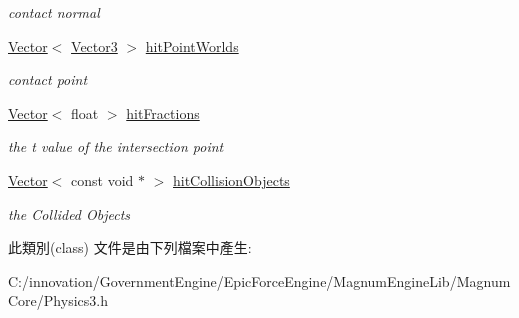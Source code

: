 \begin{DoxyCompactItemize}
\begin{DoxyCompactList}\small\item\em contact normal \end{DoxyCompactList}\item 
\hyperlink{class_i_dream_sky_1_1_vector}{Vector}$<$ \hyperlink{class_i_dream_sky_1_1_vector3}{Vector3} $>$ \hyperlink{class_i_dream_sky_1_1_physics3_1_1_ray_cast_result_a4de3080e1522809787618a7445aa776d}{hit\+Point\+Worlds}\hypertarget{class_i_dream_sky_1_1_physics3_1_1_ray_cast_result_a4de3080e1522809787618a7445aa776d}{}\label{class_i_dream_sky_1_1_physics3_1_1_ray_cast_result_a4de3080e1522809787618a7445aa776d}

\begin{DoxyCompactList}\small\item\em contact point \end{DoxyCompactList}\item 
\hyperlink{class_i_dream_sky_1_1_vector}{Vector}$<$ float $>$ \hyperlink{class_i_dream_sky_1_1_physics3_1_1_ray_cast_result_a90841fa58d0b835a265730e13198fed2}{hit\+Fractions}\hypertarget{class_i_dream_sky_1_1_physics3_1_1_ray_cast_result_a90841fa58d0b835a265730e13198fed2}{}\label{class_i_dream_sky_1_1_physics3_1_1_ray_cast_result_a90841fa58d0b835a265730e13198fed2}

\begin{DoxyCompactList}\small\item\em the t value of the intersection point \end{DoxyCompactList}\item 
\hyperlink{class_i_dream_sky_1_1_vector}{Vector}$<$ const void $\ast$ $>$ \hyperlink{class_i_dream_sky_1_1_physics3_1_1_ray_cast_result_a135790305d1f821dff9727b30323389e}{hit\+Collision\+Objects}\hypertarget{class_i_dream_sky_1_1_physics3_1_1_ray_cast_result_a135790305d1f821dff9727b30323389e}{}\label{class_i_dream_sky_1_1_physics3_1_1_ray_cast_result_a135790305d1f821dff9727b30323389e}

\begin{DoxyCompactList}\small\item\em the Collided Objects \end{DoxyCompactList}\end{DoxyCompactItemize}


此類別(class) 文件是由下列檔案中產生\+:\begin{DoxyCompactItemize}
\item 
C\+:/innovation/\+Government\+Engine/\+Epic\+Force\+Engine/\+Magnum\+Engine\+Lib/\+Magnum\+Core/Physics3.\+h\end{DoxyCompactItemize}
